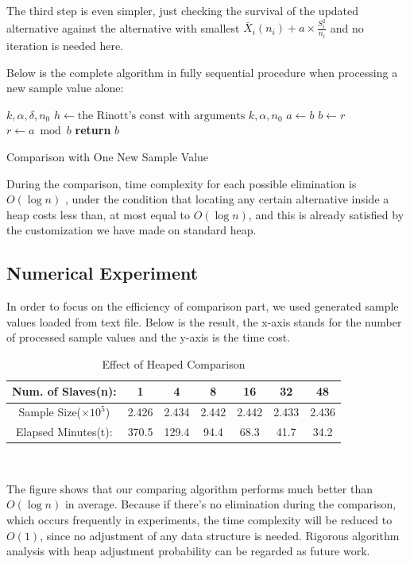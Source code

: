 The third step is even simpler, just checking the survival of the updated alternative against the alternative with smallest $\bar{X}_i(n_i) + a \times \frac{S_i^2}{n_i}$ and no iteration is needed here.

Below is the complete algorithm in fully sequential procedure when processing a new sample value alone:

\begin{algorithm}
 \begin{algorithmic}[1]
 \Require $k, \alpha, \delta, n_0$
 \State $h \gets \text{the Rinott's const with arguments } k, \alpha, n_0$
 \State 
 \State $a\gets b$
 \State $b\gets r$
 \State $r\gets a\bmod b$
 \EndWhile
 \State \textbf{return} $b$ 
 \end{algorithmic}
 \caption{Comparison with One New Sample Value}
 \label{comparsion_one}
\end{algorithm}

During the comparison, time complexity for each possible elimination is $O(\log n)$ , under the condition that locating any certain alternative inside a heap costs less than, at most equal to $O(\log n)$, and this is already satisfied by the customization we have made on standard heap.

\subsection{Numerical Experiment}

In order to focus on the efficiency of comparison part, we used generated sample values loaded from text file. Below is the result, the x-axis stands for the number of processed sample values and the y-axis is the time cost.

\begin{table}[ht]
\begin{center}
\begin{tabular}{|c|c|c|c|c|c|c|}
\hline
Num. of Slaves(n): & 1 & 4 & 8 & 16 & 32 & 48 \\
\hline
Sample Size($\times 10^5$) & 2.426 & 2.434 & 2.442 & 2.442 & 2.433 & 2.436\\
\hline
Elapsed Minutes(t): & 370.5 & 129.4 & 94.4 & 68.3 & 41.7 & 34.2 \\
\hline
\end{tabular} \\
\caption{Effect of Heaped Comparison}
\end{center}
\end{table}

The figure shows that our comparing algorithm performs much better than $O(\log n)$ in average. Because if there's no elimination during the comparison, which occurs frequently in experiments, the time complexity will be reduced to $O(1)$, since no adjustment of any data structure is needed. Rigorous algorithm analysis with heap adjustment probability can be regarded as future work.